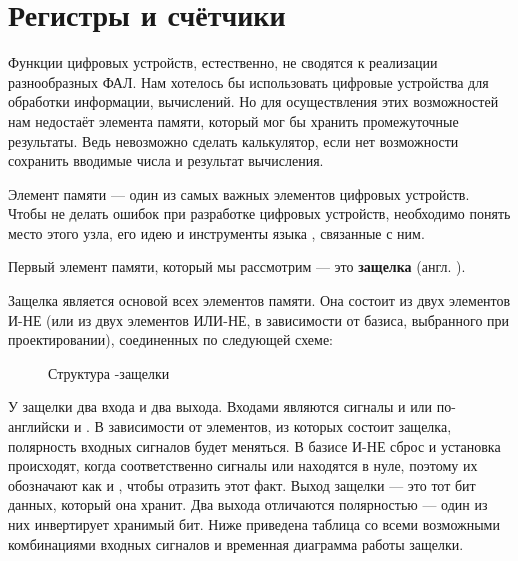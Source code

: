 \chapter{Регистры и счётчики}

\par{Функции цифровых устройств, естественно, не сводятся к реализации разнообразных ФАЛ. Нам хотелось бы использовать цифровые устройства для обработки информации, вычислений. Но для осуществления этих возможностей нам недостаёт элемента памяти, который мог бы хранить промежуточные результаты. Ведь невозможно сделать калькулятор, если нет возможности сохранить вводимые числа и результат вычисления.}

\par{Элемент памяти — один из самых важных элементов цифровых устройств. Чтобы не делать ошибок при разработке цифровых устройств, необходимо понять место этого узла, его идею и инструменты языка , связанные с ним.}

\par{Первый элемент памяти, который мы рассмотрим — это  \textbf{защелка} (англ. ).}

\par{Защелка является основой всех элементов памяти. Она состоит из двух элементов И-НЕ (или из двух элементов ИЛИ-НЕ, в зависимости от базиса, выбранного при проектировании), соединенных по следующей схеме:}

\begin{figure}[H]
  \centering
  \def\svgwidth{6cm}
  
  \caption{Структура -защелки}
\end{figure}

\par{У защелки два входа и два выхода. Входами являются сигналы  и  или по-английски  и . В зависимости от элементов, из которых состоит защелка, полярность входных сигналов будет меняться. В базисе И-НЕ сброс и установка происходят, когда соответственно сигналы  или  находятся в нуле, поэтому их обозначают как  и , чтобы отразить этот факт. Выход защелки — это тот бит данных, который она хранит. Два выхода отличаются полярностью — один из них инвертирует хранимый бит. Ниже приведена таблица со всеми возможными комбинациями входных сигналов и временная диаграмма работы защелки.}

